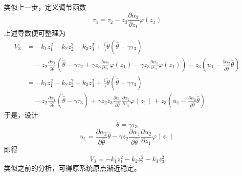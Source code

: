 类似上一步，定义调节函数\[\tau_3=\tau_2-z_3\frac{\partial \alpha_2}{\partial z_1}\varphi(z_1)\]
上述导数便可整理为
\begin{align*}
    \dot{V}_3 &=-k_1z_1^2-k_2z_2^2-k_3z_3^2+\frac{1}{\gamma}\tilde{\theta}(\dot{\hat{\theta}}-\gamma \tau_3)\\
    &\quad -z_2\frac{\partial
  \alpha_1}{\partial \hat{\theta} }\left(\dot{\hat{\theta}}-\gamma\tau_2+\gamma z_3 \frac{\partial \alpha_2}{\partial z_1}\varphi(z_1)-\gamma z_3\frac{\partial \alpha_2}{\partial z_1}\varphi(z_1)\right) +z_3\left(u_1- \frac{\partial\alpha_2}{\partial \hat{\theta}}\dot{\hat{\theta}}\right)\\
&=-k_1z_1^2-k_2z_2^2-k_3z_3^2+\frac{1}{\gamma}\tilde{\theta}(\dot{\hat{\theta}}-\gamma \tau_3)\\
    &\quad -z_2\frac{\partial
  \alpha_1}{\partial \hat{\theta} }(\dot{\hat{\theta}}-\gamma\tau_3)+\gamma z_2z_3\frac{\partial
  \alpha_1}{\partial \hat{\theta} }\frac{\partial \alpha_2}{\partial z_1}\varphi(z_1) +z_3\left(u_1- \frac{\partial\alpha_2}{\partial \hat{\theta}}\dot{\hat{\theta}}\right)
\end{align*}
于是，设计
\[\dot{\theta}=\gamma\tau_3\]
\[u_1=\frac{\partial\alpha_2}{\partial \hat{\theta}}\dot{\hat{\theta}}-\gamma z_2\frac{\partial
  \alpha_1}{\partial \hat{\theta} }\frac{\partial \alpha_2}{\partial z_1}\varphi(z_1)\]
即得\[\dot{V}_3 =-k_1z_1^2-k_2z_2^2-k_3z_3^2\]
类似之前的分析，可得原系统原点渐近稳定。